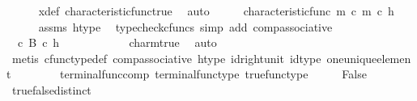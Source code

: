 \begin{isabellebody}
\ \ \ \ \isamarkupfalse%
\ x{\isacharunderscore}{\kern0pt}def\ characteristic{\isacharunderscore}{\kern0pt}func{\isacharunderscore}{\kern0pt}true\ \isamarkupfalse%
\ auto\isanewline
\ \ \isamarkupfalse%
\ \isamarkupfalse%
\ {\isachardoublequoteopen}{\isacharparenleft}{\kern0pt}characteristic{\isacharunderscore}{\kern0pt}func\ m\ {\isasymcirc}\isactrlsub c\ m{\isacharparenright}{\kern0pt}\ {\isasymcirc}\isactrlsub c\ h\ {\isacharequal}{\kern0pt}\ {\isasymf}{\isachardoublequoteclose}\isanewline
\ \ \ \ \isamarkupfalse%
\ assms\ h{\isacharunderscore}{\kern0pt}type\ \isamarkupfalse%
\ {\isacharparenleft}{\kern0pt}typecheck{\isacharunderscore}{\kern0pt}cfuncs{\isacharcomma}{\kern0pt}\ simp\ add{\isacharcolon}{\kern0pt}\ comp{\isacharunderscore}{\kern0pt}associative{}{\isacharparenright}{\kern0pt}\isanewline
\ \ \isamarkupfalse%
\ \isamarkupfalse%
\ {\isachardoublequoteopen}{\isacharparenleft}{\kern0pt}{\isasymt}\ {\isasymcirc}\isactrlsub c\ {\isasymbeta}\isactrlbsub B\isactrlesub {\isacharparenright}{\kern0pt}\ {\isasymcirc}\isactrlsub c\ h\ {\isacharequal}{\kern0pt}\ {\isasymf}{\isachardoublequoteclose}\ \ \ \ \isanewline
\ \ \ \ \isamarkupfalse%
\ char{\isacharunderscore}{\kern0pt}m{\isacharunderscore}{\kern0pt}true\ \isamarkupfalse%
\ auto\isanewline
\ \ \isamarkupfalse%
\ \isamarkupfalse%
\ {\isachardoublequoteopen}{\isasymt}\ {\isacharequal}{\kern0pt}\ {\isasymf}{\isachardoublequoteclose}\isanewline
\ \ \ \ \isamarkupfalse%
\ {\isacharparenleft}{\kern0pt}metis\ cfunc{\isacharunderscore}{\kern0pt}type{\isacharunderscore}{\kern0pt}def\ comp{\isacharunderscore}{\kern0pt}associative\ h{\isacharunderscore}{\kern0pt}type\ id{\isacharunderscore}{\kern0pt}right{\isacharunderscore}{\kern0pt}unit{}\ id{\isacharunderscore}{\kern0pt}type\ one{\isacharunderscore}{\kern0pt}unique{\isacharunderscore}{\kern0pt}element\isanewline
\ \ \ \ \ \ \ \ terminal{\isacharunderscore}{\kern0pt}func{\isacharunderscore}{\kern0pt}comp\ terminal{\isacharunderscore}{\kern0pt}func{\isacharunderscore}{\kern0pt}type\ true{\isacharunderscore}{\kern0pt}func{\isacharunderscore}{\kern0pt}type{\isacharparenright}{\kern0pt}\isanewline
\ \ \isamarkupfalse%
\ \isamarkupfalse%
\ False\isanewline
\ \ \ \ \isamarkupfalse%
\ true{\isacharunderscore}{\kern0pt}false{\isacharunderscore}{\kern0pt}distinct\ \isamarkupfalse%

\end{isabellebody}
